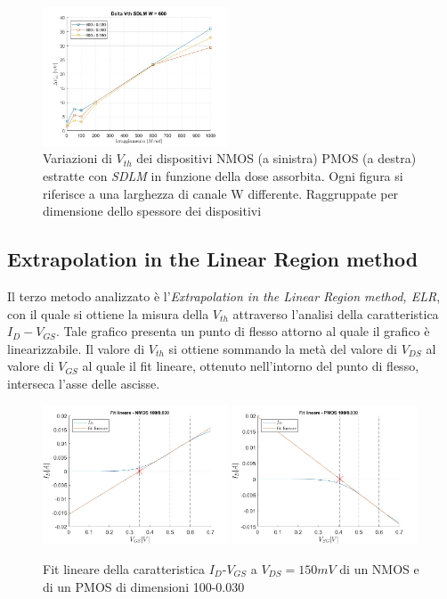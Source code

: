 \documentclass[
	a4paper,
	cleardoublepage=empty,
	headings=twolinechapter,
	numbers=autoenddot,
]{scrbook}
\begin{document}
\begin{figure}[H]
  \includegraphics[width=0.49\textwidth]{sovrapposizione-deltaVth-SDLM-P600}
  \caption{Variazioni di $V_{th}$ dei dispositivi NMOS (a sinistra) PMOS (a destra) estratte con \emph{SDLM} in funzione della dose assorbita. Ogni figura si riferisce a una larghezza di canale W differente. Raggruppate per dimensione dello spessore dei dispositivi}
\end{figure}

\subsection{Extrapolation in the Linear Region method}

Il
terzo metodo analizzato è l'\emph{Extrapolation in the Linear Region method, ELR}, con il quale si ottiene la misura della $V_{th}$ attraverso l'analisi della caratteristica $I_D-V_{GS}$.  Tale grafico presenta un punto di flesso attorno al quale il grafico è linearizzabile. Il valore di $V_{th}$ si ottiene sommando la metà del valore di $V_{DS}$ al valore di $V_{GS}$ al quale il fit lineare, ottenuto nell'intorno del punto di flesso, interseca l'asse delle ascisse.

\begin{figure}[h!]
  \centering
  \includegraphics[width=0.49\textwidth]{LinearFit-N4-100-30}
  \includegraphics[width=0.49\textwidth]{LinearFit-P1-100-30}
  \caption{Fit lineare della caratteristica  $I_D$-$V_{GS}$ a $V_{DS}=150mV$ di un NMOS e di un PMOS di dimensioni 100-0.030 }
\end{figure}
\end{document}
